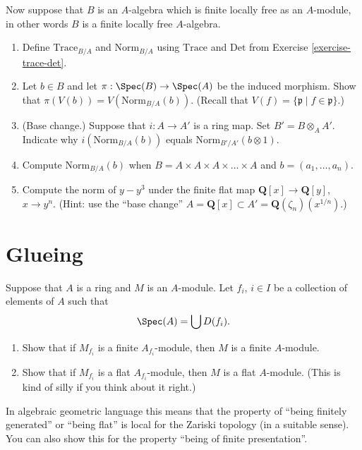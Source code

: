 \begin{exercise}
\label{exercise-trace-det-rings}
Now suppose that $B$ is an $A$-algebra which is finite
locally free as an $A$-module, in other words $B$ is a finite locally
free $A$-algebra.
\begin{enumerate}
\item Define $\text{Trace}_{B/A}$ and $\text{Norm}_{B/A}$ using
$\text{Trace}$ and $\text{Det}$ from Exercise \ref{exercise-trace-det}.
\item Let $b\in B$ and let $\pi : \Spec(B) \to \Spec(A)$ be
the induced morphism. Show that $\pi(V(b)) = V(\text{Norm}_{B/A}(b))$.
(Recall that $V(f) = \{ {\mathfrak p} \mid f \in {\mathfrak p}\}$.)
\item (Base change.) Suppose that $i : A \to A'$ is a ring map. Set
$B' = B \otimes_A A'$. Indicate why $i(\text{Norm}_{B/A}(b))$ equals
$\text{Norm}_{B'/A'}(b \otimes 1)$.
\item Compute $\text{Norm}_{B/A}(b)$ when
$B = A \times A \times A \times \ldots \times A$
and $b = (a_1, \ldots, a_n)$.
\item Compute the norm of $y-y^3$ under the finite flat
map ${\mathbf Q}[x] \to {\mathbf Q}[y]$, $x \to y^n$. (Hint: use
the ``base change''
$A = {\mathbf Q}[x] \subset A' = {\mathbf Q}(\zeta_n)(x^{1/n})$.)
\end{enumerate}
\end{exercise}



\section{Glueing}
\label{section-glueing}

\begin{exercise}
\label{exercise-cover}
Suppose that $A$ is a ring and $M$ is an $A$-module.
Let $f_i$, $i \in I$ be a collection of elements of $A$ such that
$$
\Spec(A) = \bigcup D(f_i).
$$
\begin{enumerate}
\item Show that if $M_{f_i}$ is a finite $A_{f_i}$-module,
then $M$ is a finite $A$-module.
\item Show that if $M_{f_i}$ is a flat $A_{f_i}$-module,
then $M$ is a flat $A$-module.
(This is kind of silly if you think about it right.)
\end{enumerate}
\end{exercise}

\begin{remark}
\label{remark-cover}
In algebraic geometric language this means that the property
of ``being finitely generated'' or ``being flat'' is local for the Zariski
topology (in a suitable sense). You can also show this for the property
``being of finite presentation''.
\end{remark}

